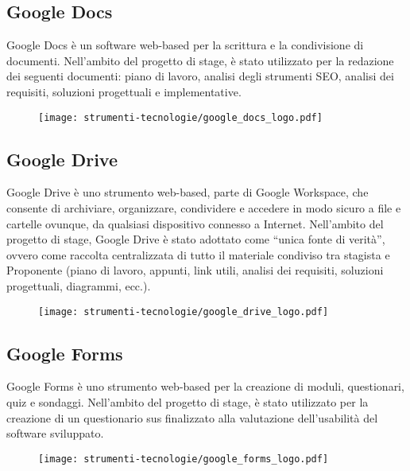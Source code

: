 \subsection*{Google Docs}

\par Google Docs è un software web-based per la scrittura e la condivisione di documenti. Nell’ambito del progetto di stage, è stato utilizzato per la redazione dei seguenti documenti: piano di lavoro, analisi degli strumenti SEO, analisi dei requisiti, soluzioni progettuali e implementative.

\begin{figure}[H]
    \centering 
    \texttt{[image: strumenti-tecnologie/google\_docs\_logo.pdf]} 
\end{figure}

\subsection*{Google Drive}

\par Google Drive è uno strumento web-based, parte di Google Workspace, che consente di archiviare, organizzare, condividere e accedere in modo sicuro a file e cartelle ovunque, da qualsiasi dispositivo connesso a Internet. Nell’ambito del progetto di stage, Google Drive è stato adottato come “unica fonte di verità”, ovvero come raccolta centralizzata di tutto il materiale condiviso tra stagista e Proponente (piano di lavoro, appunti, link utili, analisi dei requisiti, soluzioni progettuali, diagrammi, ecc.).

\begin{figure}[H]
    \centering 
    \texttt{[image: strumenti-tecnologie/google\_drive\_logo.pdf]} 
\end{figure}

\subsection*{Google Forms}

\par Google Forms è uno strumento web-based per la creazione di moduli, questionari, quiz e sondaggi. Nell’ambito del progetto di stage, è stato utilizzato per la creazione di un questionario \gls{sus} finalizzato alla valutazione dell’usabilità del software sviluppato.

\begin{figure}[H]
    \centering 
    \texttt{[image: strumenti-tecnologie/google\_forms\_logo.pdf]} 
\end{figure}

